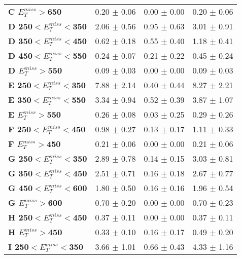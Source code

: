 \begin{table}[h]
{\begin{tabular}{|l|ccc|}
\textbf{ C $E_T^{miss}>$650}     & 0.20 $\pm$ 0.06       & 0.00 $\pm$ 0.00       & 0.20 $\pm$ 0.06       \\
\textbf{ D 250$<E_T^{miss}<$350}         & 2.06 $\pm$ 0.56       & 0.95 $\pm$ 0.63       & 3.01 $\pm$ 0.91       \\
\textbf{ D 350$<E_T^{miss}<$450}         & 0.62 $\pm$ 0.18       & 0.55 $\pm$ 0.40       & 1.18 $\pm$ 0.41       \\
\textbf{ D 450$<E_T^{miss}<$550}         & 0.24 $\pm$ 0.07       & 0.21 $\pm$ 0.22       & 0.45 $\pm$ 0.24       \\
\textbf{ D $E_T^{miss}>$550}     & 0.09 $\pm$ 0.03       & 0.00 $\pm$ 0.00       & 0.09 $\pm$ 0.03       \\
\textbf{ E 250$<E_T^{miss}<$350}         & 7.88 $\pm$ 2.14       & 0.40 $\pm$ 0.44       & 8.27 $\pm$ 2.21       \\
\textbf{ E 350$<E_T^{miss}<$550}         & 3.34 $\pm$ 0.94       & 0.52 $\pm$ 0.39       & 3.87 $\pm$ 1.07       \\
\textbf{ E $E_T^{miss}>$550}     & 0.26 $\pm$ 0.08       & 0.03 $\pm$ 0.25       & 0.29 $\pm$ 0.26       \\
\textbf{ F 250$<E_T^{miss}<$450}         & 0.98 $\pm$ 0.27       & 0.13 $\pm$ 0.17       & 1.11 $\pm$ 0.33       \\
\textbf{ F $E_T^{miss}>$450}     & 0.21 $\pm$ 0.06       & 0.00 $\pm$ 0.00       & 0.21 $\pm$ 0.06       \\
\textbf{ G 250$<E_T^{miss}<$350}         & 2.89 $\pm$ 0.78       & 0.14 $\pm$ 0.15       & 3.03 $\pm$ 0.81       \\
\textbf{ G 350$<E_T^{miss}<$450}         & 2.51 $\pm$ 0.71       & 0.16 $\pm$ 0.18       & 2.67 $\pm$ 0.77       \\
\textbf{ G 450$<E_T^{miss}<$600}         & 1.80 $\pm$ 0.50       & 0.16 $\pm$ 0.16       & 1.96 $\pm$ 0.54       \\
\textbf{ G $E_T^{miss}>$600}     & 0.70 $\pm$ 0.20       & 0.00 $\pm$ 0.00       & 0.70 $\pm$ 0.23       \\
\textbf{ H 250$<E_T^{miss}<$450}         & 0.37 $\pm$ 0.11       & 0.00 $\pm$ 0.00       & 0.37 $\pm$ 0.11       \\
\textbf{ H $E_T^{miss}>$450}     & 0.33 $\pm$ 0.10       & 0.16 $\pm$ 0.17       & 0.49 $\pm$ 0.20       \\
\hline
\textbf{ I 250$<E_T^{miss}<$350}         & 3.66 $\pm$ 1.01       & 0.66 $\pm$ 0.43       & 4.33 $\pm$ 1.16       \\

\end{tabular}}
\end{table}
